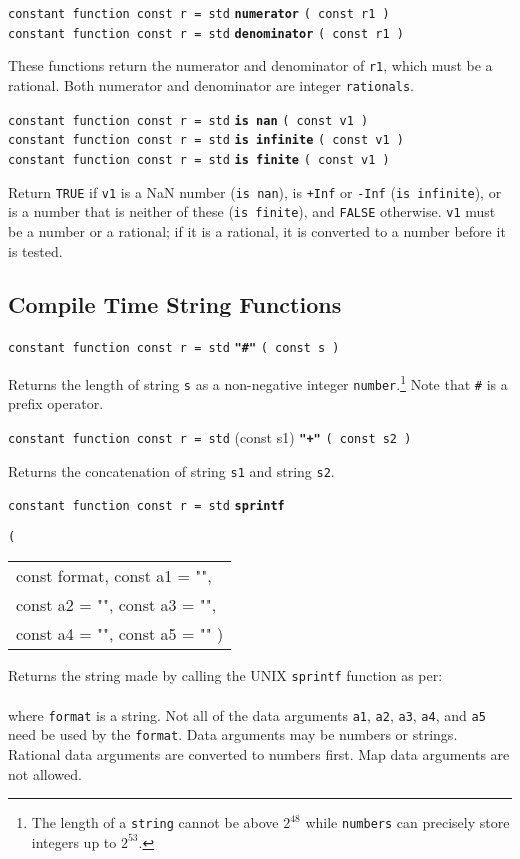\documentclass[12pt]{article}
\newcommand{\ttkey}[1]{{\tt \bfseries #1}}
\newenvironment{indpar}[1][0.3in]%
	{\begin{list}{}%
		     {\setlength{\itemsep}{0in}%
		      \setlength{\topsep}{0in}%
		      \setlength{\parsep}{1ex}%
		      \setlength{\labelwidth}{#1}%
		      \setlength{\leftmargin}{#1}%
		      \addtolength{\leftmargin}{\labelsep}}%
	 \item}%
	{\end{list}}
\begin{document}
{\tt constant function const r = std} \ttkey{numerator} {\tt ( const r1 )} \\
{\tt constant function const r = std} \ttkey{denominator} {\tt ( const r1 )}
\begin{indpar}
These functions return the numerator and denominator of {\tt r1},
which must be a rational.
Both numerator and denominator are integer {\tt rationals}.
\end{indpar}

{\tt constant function const r = std} \ttkey{is nan} {\tt ( const v1 )} \\
{\tt constant function const r = std} \ttkey{is infinite} {\tt ( const v1 )} \\
{\tt constant function const r = std} \ttkey{is finite} {\tt ( const v1 )}
\begin{indpar}
Return {\tt TRUE} if {\tt v1} is a NaN number ({\tt is nan}),
is {\tt +Inf} or {\tt -Inf} ({\tt is infinite}), or
is a number that is neither of these ({\tt is finite}), and {\tt FALSE}
otherwise.  {\tt v1} must be a number or a rational;
if it is a rational, it is converted to a number before it is tested.
\end{indpar}

\subsection{Compile Time String Functions}

{\tt constant function const r = std} \ttkey{"\#"} {\tt ( const s )}
\begin{indpar}
Returns the length of string {\tt s} as a non-negative integer
{\tt number}.\footnote{The length of a {\tt string} cannot
be above $2^{48}$ while
{\tt numbers} can precisely store integers up to $2^{53}$.}
Note that {\tt \#} is a prefix operator.
\end{indpar}

{\tt constant function const r = std} (const s1) \ttkey{"+"} {\tt ( const s2 )}
\begin{indpar}
Returns the concatenation of string {\tt s1}
and string {\tt s2}.
\end{indpar}

{\tt constant function const r = std} \ttkey{sprintf}
    {\tt ( \begin{tabular}[t]{@{}l}
            const format, const a1 = "", \\
	    const a2 = "", const a3 = "", \\
	    const a4 = "", const a5 = "" )
	    \end{tabular} }
\begin{indpar}
Returns the string made by calling the UNIX {\tt sprintf} function as per: \\
\hspace*{1in}{\tt sprintf ( format, a1, a2, a3, a4, a5 )} \\
where {\tt format} is a string.  Not all of the data arguments
{\tt a1}, {\tt a2}, {\tt a3}, {\tt a4}, and {\tt a5}
need be used by the {\tt format}.
Data arguments may be numbers or strings.
Rational data arguments are converted to numbers first.  Map data arguments
are not allowed.
\end{indpar}
\end{document}

